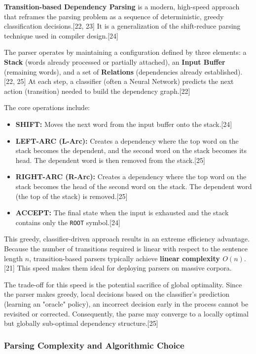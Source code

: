 \documentclass{article}
\begin{document}
\textbf{Transition-based Dependency Parsing} is a modern, high-speed approach that reframes the parsing problem as a sequence of deterministic, greedy classification decisions.[22, 23] It is a generalization of the shift-reduce parsing technique used in compiler design.[24]

The parser operates by maintaining a configuration defined by three elements: a \textbf{Stack} (words already processed or partially attached), an \textbf{Input Buffer} (remaining words), and a set of \textbf{Relations} (dependencies already established).[22, 25] At each step, a classifier (often a Neural Network) predicts the next action (transition) needed to build the dependency graph.[22]

The core operations include:
\begin{itemize}
    \item \textbf{SHIFT:} Moves the next word from the input buffer onto the stack.[24]
    \item \textbf{LEFT-ARC (L-Arc):} Creates a dependency where the top word on the stack becomes the dependent, and the second word on the stack becomes its head. The dependent word is then removed from the stack.[25]
    \item \textbf{RIGHT-ARC (R-Arc):} Creates a dependency where the top word on the stack becomes the head of the second word on the stack. The dependent word (the top of the stack) is removed.[25]
    \item \textbf{ACCEPT:} The final state when the input is exhausted and the stack contains only the \texttt{ROOT} symbol.[24]
\end{itemize}

This greedy, classifier-driven approach results in an extreme efficiency advantage. Because the number of transitions required is linear with respect to the sentence length $n$, transition-based parsers typically achieve \textbf{linear complexity $O(n)$}.[21] This speed makes them ideal for deploying parsers on massive corpora.

The trade-off for this speed is the potential sacrifice of global optimality. Since the parser makes greedy, local decisions based on the classifier's prediction (learning an "oracle" policy), an incorrect decision early in the process cannot be revisited or corrected. Consequently, the parse may converge to a locally optimal but globally sub-optimal dependency structure.[25]

\subsubsection{Parsing Complexity and Algorithmic Choice}
\end{document}
